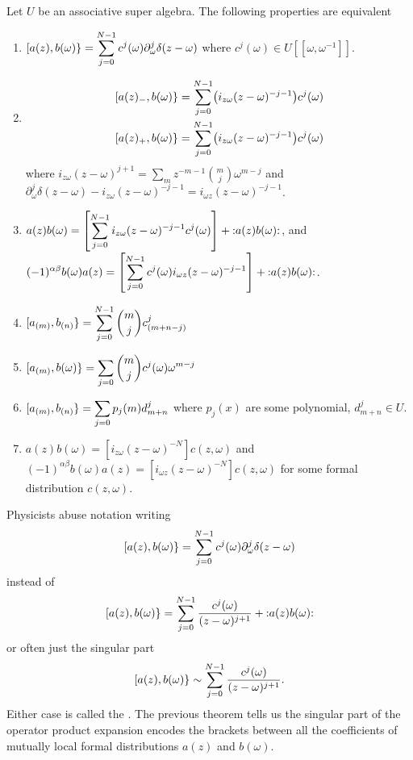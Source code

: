 Let $U$ be an associative super algebra.
The following properties are equivalent
\begin{enumerate}
\item
  $\displaystyle[a(z),b(\omega)\}=\sum^{N-1}_{j=0}c^{j}(\omega)\partial_{\omega}^{j}\delta(z-\omega)$
  where $c^{j}(\omega)\in U[[\omega,\omega^{-1}]]$.
\item
\begin{align*}
\superb{a(z)_{-}}{b(\omega)} &= \sum^{N-1}_{j=0}\bigl(i_{z\omega}(z-\omega)^{-j-1}\bigr)c^{j}(\omega)\\
\superb{a(z)_{+}}{b(\omega)} &= \sum^{N-1}_{j=0}\bigl(i_{z\omega}(z-\omega)^{-j-1}\bigr)c^{j}(\omega)
\end{align*}
where $i_{z\omega}(z-\omega)^{j+1}=\sum_{m}z^{-m-1}\binom{m}{j}\omega^{m-j}$ and
$\partial_{\omega}^{j}\delta(z-\omega)-i_{z\omega}(z-\omega)^{-j-1}=i_{\omega
z}(z-\omega)^{-j-1}$.
\item $\displaystyle
a(z)b(\omega)=\left[\sum^{N-1}_{j=0}i_{z\omega}(z-\omega)^{-j-1}c^{j}(\omega)\right]+\mathop{:}\nolimits\!a(z)b(\omega)\!\mathop{:}\nolimits$,
and
$\displaystyle
(-1)^{\alpha\beta}b(\omega)a(z)=\left[\sum^{N-1}_{j=0}c^{j}(\omega)i_{\omega z}
(z-\omega)^{-j-1}\right]+\mathop{:}\nolimits\!a(z)b(\omega)\!\mathop{:}\nolimits$.
\item $\displaystyle[a_{(m)},b_{(n)}\}=\sum^{N-1}_{j=0}\binom{m}{j}c^{j}_{(m+n-j)}$
\item $\displaystyle[a_{(m)},b(\omega)\}=\sum_{j=0}\binom{m}{j}c^{j}(\omega)\omega^{m-j}$
\item
$\displaystyle[a_{(m)},b_{(n)}\}=\sum_{j=0}p_{j}(m)d^{j}_{m+n}$
where $p_{j}(x)$ are some polynomial, $d^{j}_{m+n}\in U$.
\item $a(z)b(\omega)=\left[i_{z\omega}(z-\omega)^{-N}\right]c(z,\omega)$
and $(-1)^{\alpha\beta}b(\omega)a(z)=[i_{\omega z}(z-\omega)^{-N}]c(z,\omega)$
for some formal distribution $c(z,\omega)$.
\end{enumerate}

\M
Physicists abuse notation writing
\begin{equation}
[a(z),b(\omega)\}=\sum^{N-1}_{j=0}c^{j}(\omega)\partial_{\omega}^{j}\delta(z-\omega)
\end{equation}
instead of
\begin{equation}
[a(z),b(\omega)\}=\sum^{N-1}_{j=0}\frac{c^{j}(\omega)}{(z-\omega)^{j+1}}+\mathop{:}\nolimits\!a(z)b(\omega)\!\mathop{:}\nolimits
\end{equation}
or often just the singular part
\begin{equation}
[a(z),b(\omega)\}\sim\sum^{N-1}_{j=0}\frac{c^{j}(\omega)}{(z-\omega)^{j+1}}.
\end{equation}
Either case is called the . The
previous theorem tells us the singular part of the operator product
expansion encodes the brackets between all the coefficients of mutually
local formal distributions $a(z)$ and $b(\omega)$.

